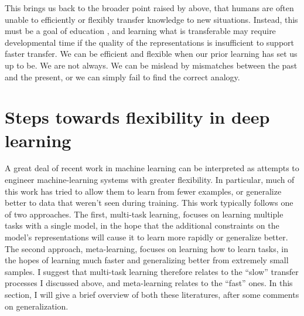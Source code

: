 This brings us back to the broader point raised by \citet{Detterman1993} above, that humans are often unable to efficiently or flexibly transfer knowledge to new situations. Instead, this must be a goal of education \citep{Bransford1999}, and learning what is transferable may require developmental time \citep{Lampinen2017a} if the quality of the representations is insufficient to support faster transfer. We can be efficient and flexible when our prior learning has set us up to be. We are not always. We can be mislead by mismatches between the past and the present, or we can simply fail to find the correct analogy.\par

\section{Steps towards flexibility in deep learning}

A great deal of recent work in machine learning can be interpreted as attempts to engineer machine-learning systems with greater flexibility. In particular, much of this work has tried to allow them to learn from fewer examples, or generalize better to data that weren't seen during training. This work typically follows one of two approaches. The first, multi-task learning, focuses on learning multiple tasks with a single model, in the hope that the additional constraints on the model's representations will cause it to learn more rapidly or generalize better. The second approach, meta-learning, focuses on learning how to learn tasks, in the hopes of learning much faster and generalizing better from extremely small samples. I suggest that multi-task learning therefore relates to the ``slow'' transfer processes I discussed above, and meta-learning relates to the ``fast'' ones. In this section, I will give a brief overview of both these literatures, after some comments on generalization. \par

